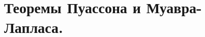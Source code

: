 \documentclass[polytech/stats/exam-2023/stats-exam-2023.tex]{subfiles}
\begin{document}
\section{Теоремы Пуассона и Муавра-Лапласа.}
\end{document}
